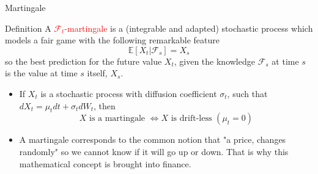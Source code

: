\documentclass{beamer}
\begin{document}
\begin{frame}{Martingale}
	\begin{block}{Definition}
		A \textcolor{red}{$\mathcal{F}_t$-martingale} is a (integrable and adapted) stochastic process which models a fair game with the following remarkable feature
		\begin{equation}
			\mathbb{E}[X_t|\mathcal{F}_s] = X_s
		\end{equation}
		so the best prediction for the future value $X_t$, given the knowledge $\mathcal{F}_s$ at time $s$ is the value at time $s$ itself, $X_s$.
	\end{block}
	\begin{itemize}
	\item If $X_t$ is a stochastic process with diffusion coefficient $\sigma_t$, such that %
	$dX_t=\mu_t dt+\sigma_t dW_t$, then 
	\begin{equation*}
		X\text{ is a martingale } \iff X\text{ is drift-less } (\mu_t=0)
	\end{equation*}
	\item A martingale corresponds to the common notion that "a price, changes randomly" so we cannot know if it will go up or down. That is why this mathematical concept is brought into finance.
\end{itemize}	
\end{frame}

%	
\end{document}
